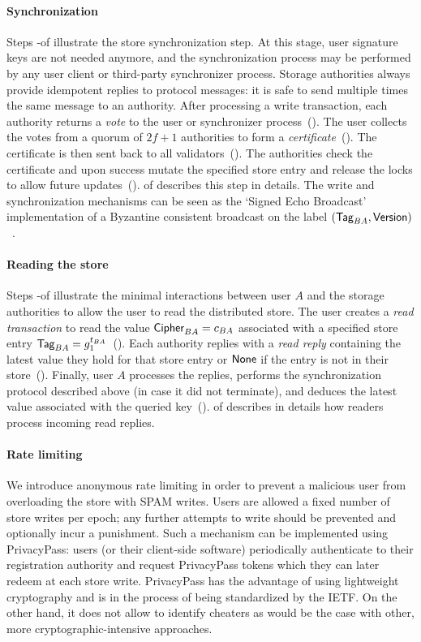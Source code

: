 \paragraph{Synchronization}
Steps \four-\seven of  illustrate the store synchronization step. At this stage, user signature keys are not needed anymore, and the synchronization process may be performed by any user client or third-party synchronizer process. Storage authorities always provide idempotent replies to protocol messages: it is safe to send multiple times the same message to an authority.
%
After processing a write transaction, each authority returns a \emph{vote} to the user or synchronizer process~(\four).
%
The user collects the votes from a quorum of $2f+1$ authorities to form a \emph{certificate}~(\five).
%
The certificate is then sent back to all validators~(\six).
%
The authorities check the certificate and upon success mutate the specified store entry and release the locks to allow future updates~(\seven).  of  describes this step in details.
%
The write and synchronization mechanisms can be seen as the ‘Signed Echo Broadcast’ implementation of a Byzantine consistent broadcast on the label $(\textsf{Tag}_{BA}, \textsf{Version})$~\cite{cachin2011introduction}.

\paragraph{Reading the store}
Steps \eight-\ten of  illustrate the minimal interactions between user $A$ and the storage authorities to allow the user to read the distributed store.
%
The user creates a \emph{read transaction} to read the value $\textsf{Cipher}_{BA} = c_{BA}$ associated with a specified store entry $\textsf{Tag}_{BA} = g_1^{t_{BA}}$~(\eight).
%
Each authority replies with a \emph{read reply} containing the latest value they hold for that store entry or $\textsf{None}$ if the entry is not in their store~(\nine).
%
Finally, user $A$ processes the replies, performs the synchronization protocol described above (in case it did not terminate), and deduces the latest value associated with the queried key~(\ten).  of  describes in details how readers process incoming read replies.

\paragraph{Rate limiting} We introduce anonymous rate limiting in order to prevent a malicious user from overloading the store with SPAM writes. Users are allowed a fixed number of store writes per epoch; any further attempts to write should be prevented and optionally incur a punishment. Such a mechanism can be implemented using PrivacyPass: users (or their client-side software) periodically authenticate to their registration authority and request PrivacyPass tokens which they can later redeem at each store write. PrivacyPass has the advantage of using lightweight cryptography and is in the process of being standardized by the IETF. On the other hand, it does not allow to identify cheaters as would be the case with other, more cryptographic-intensive approaches.

